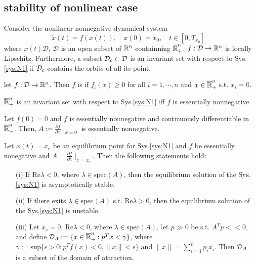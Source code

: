 \documentclass{paper}
\begin{document}
\subsection{stability of nonlinear case}
Consider the nonlinear nonnegative dynamical system
\begin{equation}\label{sys:N1}
\dot{x}(t)=f(x(t)),\quad x(0)=x_0,\quad t\in[0,T_{x_0}]
\end{equation}
where $x(t)\mathcal{D}$, $\mathcal{D}$ is an open subset of $\mathbb{R}^{n}$ containning $\overline{\mathbb{R}}_{+}^{n}$, 
${f}:{\mathcal{D}}\rightarrow{\mathbb{R}^{n}}$ is locally Lipschitz. Furthermore, a subset $\mathcal{D}_{c}\subset \mathcal{D}$ is
an invariant set with respect to Sys.\ref{sys:N1} if $\mathcal{D}_c$ contains the orbits of all its point.
\begin{defi}
let ${f}:{\mathcal{D}}\rightarrow{\mathbb{R}^{n}}$. Then $f$ is  if $f_i(x)\geqslant 0$
for all $i=1,\cdots,n$ and $x\in \overline{\mathbb{R}}_{+}^{n}$ s.t. $x_i=0$.
\end{defi}
\begin{prop}
$\overline{\mathbb{R}}_{+}^{n}$ is an invariant set with respect to Sys.\ref{sys:N1} iff $f$ is essentially nonnegative.
\end{prop}
\begin{lem}
Let $f(0)=0$ and $f$ is essentially nonnegative and continuously differentiable in $\overline{\mathbb{R}}_{+}^{n}$. Then,
$A:=\frac{\partial f}{\partial x}\mid_{x=0}$ is essentially nonnegative.
\end{lem}
\begin{thm}
Let $x(t)=x_e$ be an equilibrium point for Sys.\ref{sys:N1} and $f$ be essentially nonegative and 
$A=\frac{\partial f}{\partial x}\mid_{x=x_e}$. Then the following statements hold:
\begin{enumerate}
\item[(i)] If Re$\lambda < 0$, where $\lambda\in\text{spec}(A)$, then the equilibrium solution of the 
Sys.\ref{sys:N1} is asymptotically stable.
\item[(ii)] If there exits $\lambda\in\text{spec}(A)$ s.t. Re$\lambda > 0$, then the equilibrium 
solution of the Sys.\ref{sys:N1} is unstable.
\item[(iii)] Let $x_e=0$, Re$\lambda < 0$, where $\lambda\in\text{spec}(A)$, let $p\gg 0$ be s.t.
$A^Tp<<0$, and define $\mathcal{D}_A:=\{x\in\overline{\mathbb{R}}_{+}^{n}:p^Tx<\gamma\}$, where $\gamma:=\text{sup}\{\epsilon>0:
p^Tf(x)<0,\lVert x\rVert<\epsilon\}$ and $\lVert x\rVert=\sum_{i=1}^{n}p_ix_i$. Then $\mathcal{D}_A$ is a
subset of the domain of attraction.
\end{enumerate}
\end{thm}
\end{document}

